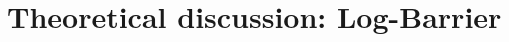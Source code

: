 \documentclass[aspectratio=169,xcolor=dvipsnames]{beamer}
\begin{document}












\section{Theoretical discussion: Log-Barrier}

\begin{frame}
    \tableofcontents[currentsection]
\end{frame}
    
\end{document}
